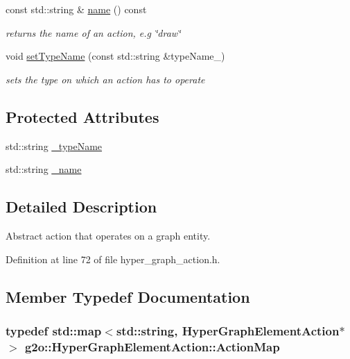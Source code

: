 \begin{DoxyCompactItemize}
const std\+::string \& \hyperlink{classg2o_1_1HyperGraphElementAction_ad585ae95767ee74789a18c758f750cfb}{name} () const 
\begin{DoxyCompactList}\small\item\em returns the name of an action, e.\+g \char`\"{}draw\char`\"{} \end{DoxyCompactList}\item 
void \hyperlink{classg2o_1_1HyperGraphElementAction_ae7ed5834d50fb0ff0fef8ec45caaaa3f}{set\+Type\+Name} (const std\+::string \&type\+Name\+\_\+)
\begin{DoxyCompactList}\small\item\em sets the type on which an action has to operate \end{DoxyCompactList}\end{DoxyCompactItemize}
\subsection*{Protected Attributes}
\begin{DoxyCompactItemize}
\item 
std\+::string \hyperlink{classg2o_1_1HyperGraphElementAction_ae05082e218d213f8db5de7a79769f97c}{\+\_\+type\+Name}
\item 
std\+::string \hyperlink{classg2o_1_1HyperGraphElementAction_a31245b0a79dfb357e3b345ff57b7b491}{\+\_\+name}
\end{DoxyCompactItemize}


\subsection{Detailed Description}
Abstract action that operates on a graph entity. 

Definition at line 72 of file hyper\+\_\+graph\+\_\+action.\+h.



\subsection{Member Typedef Documentation}
\subsubsection[{\texorpdfstring{Action\+Map}{ActionMap}}]{\setlength{\rightskip}{0pt plus 5cm}typedef std\+::map$<$std\+::string, {\bf Hyper\+Graph\+Element\+Action}$\ast$$>$ {\bf g2o\+::\+Hyper\+Graph\+Element\+Action\+::\+Action\+Map}}\hypertarget{classg2o_1_1HyperGraphElementAction_abc889fc90ae1bbb63d90c7993777417a}{}\label{classg2o_1_1HyperGraphElementAction_abc889fc90ae1bbb63d90c7993777417a}


